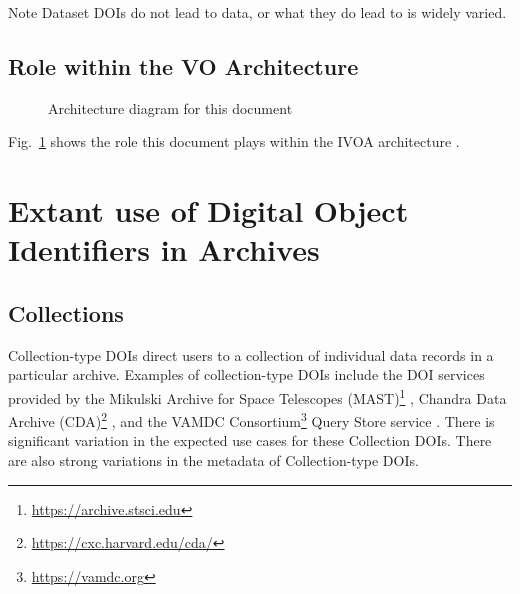 \documentclass[11pt,a4paper]{ivoa}
\begin{document}
\begin{admonition}{Note}
Dataset DOIs do not lead to data, or what they do lead to is widely varied.
\end{admonition}


\subsection{Role within the VO Architecture}

\begin{figure}
\centering


\caption{Architecture diagram for this document}
\label{fig:archdiag}
\end{figure}

Fig.~\ref{fig:archdiag} shows the role this document plays within the
IVOA architecture \citep{2021ivoa.spec.1101D}.


\section{Extant use of Digital Object Identifiers in Archives}

\subsection{Collections}
\label{sec:intro:collections}


Collection-type DOIs direct users to a collection of individual data records in a particular archive.
Examples of collection-type DOIs include the DOI services provided by the Mikulski Archive for Space Telescopes (MAST)\footnote{\url{https://archive.stsci.edu}} \citep{2018ApJS..236...20N}, Chandra Data Archive (CDA)\footnote{\url{https://cxc.harvard.edu/cda/}} \citep{2018EPJWC.18612011R}, and the VAMDC Consortium\footnote{\url{https://vamdc.org}} Query Store service \citep{2018Galax...6..105M}.  
There is significant variation in the expected use cases for these Collection DOIs. 
There are also strong variations in the metadata of Collection-type DOIs.
\end{document}

